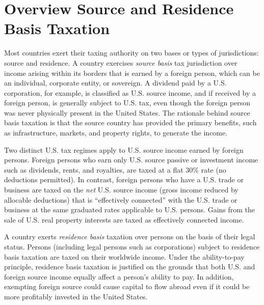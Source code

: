 	\section{Overview  Source and Residence Basis Taxation}
	
Most countries  exert their taxing authority on two bases or types of jurisdictions: source and residence.  A country exercises \emph{source basis} tax jurisdiction over income arising within its borders that is earned by a foreign person, which can be an individual, corporate entity, or sovereign.  A dividend paid by a U.S. corporation, for example, is classified as U.S. source income, and if received by a foreign person, is generally subject to U.S. tax, even though the foreign person was never physically present in the United States.  The rationale behind source basis taxation is that the source country has provided the primary benefits, such as infrastructure, markets, and property rights,  to generate the income.    
	
Two distinct  U.S. tax regimes apply to U.S. source income earned by foreign persons.  Foreign persons who earn only U.S. source passive or investment income such as dividends, rents, and royalties, are taxed at a flat 30\% rate (no deductions permitted).  In contrast, foreign persons who have a U.S. trade or business are taxed on the \emph{net}  U.S. source income (gross income reduced by allocable deductions) that is ``effectively connected'' with the U.S. trade or business at the same graduated rates applicable to U.S. persons. Gains from the sale of U.S. real property interests are taxed as effectively connected income. 

A country exerts \emph{residence basis} taxation  over persons on the basis of their legal status.  Persons (including legal persons such as corporations) subject to residence basis taxation are taxed on their worldwide income.  Under the ability-to-pay principle, residence basis taxation is justified on the grounds that both U.S. and foreign source income equally affect a person's ability to pay.  In addition, exempting foreign source could cause capital to flow abroad even if it could be more profitably invested in the United States.


